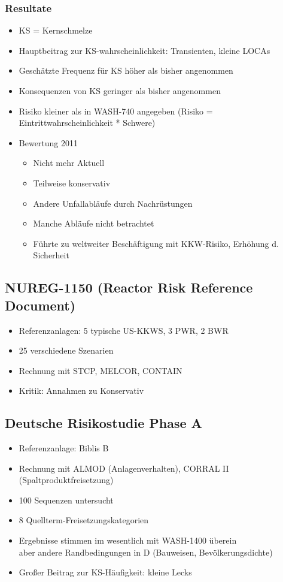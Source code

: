 \documentclass[12pt]{article}
\begin{document}
\subsubsection{Resultate}
\begin{itemize}[noitemsep]
	\item KS = Kernschmelze
	\item Hauptbeitrag zur KS-wahrscheinlichkeit: Transienten, kleine LOCAs
	\item Geschätzte Frequenz für KS höher als bisher angenommen
	\item Konsequenzen von KS geringer als bisher angenommen
	\item Risiko kleiner als in WASH-740 angegeben (Risiko = Eintrittwahrscheinlichkeit * Schwere)
	\item Bewertung 2011
		\begin{itemize}[noitemsep]
			\item Nicht mehr Aktuell
			\item Teilweise konservativ
			\item Andere Unfallabläufe durch Nachrüstungen
			\item Manche Abläufe nicht betrachtet
			\item Führte zu weltweiter Beschäftigung mit KKW-Risiko, Erhöhung d. Sicherheit
		\end{itemize}
\end{itemize}

\subsection{NUREG-1150 (Reactor Risk Reference Document)}
\begin{itemize}[noitemsep]
	\item Referenzanlagen: 5 typische US-KKWS, 3 PWR, 2 BWR
	\item 25 verschiedene Szenarien
	\item Rechnung mit STCP, MELCOR, CONTAIN
	\item Kritik: Annahmen zu Konservativ
\end{itemize}

\subsection{Deutsche Risikostudie Phase A}
\begin{itemize}[noitemsep]
	\item Referenzanlage: Biblis B
	\item Rechnung mit ALMOD (Anlagenverhalten), CORRAL II (Spaltproduktfreisetzung)
	\item 100 Sequenzen untersucht
	\item 8 Quellterm-Freisetzungskategorien
	\item Ergebnisse stimmen im wesentlich mit WASH-1400 überein\\
		aber andere Randbedingungen in D (Bauweisen, Bevölkerungsdichte)
	\item Großer Beitrag zur KS-Häufigkeit: kleine Lecks
\end{itemize}
\end{document}
